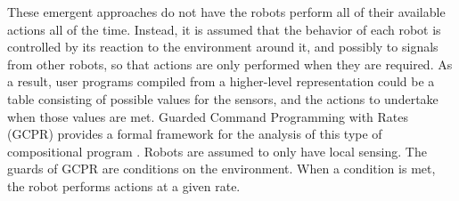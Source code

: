 \documentclass[]{article}
\begin{document}
These emergent approaches do not have the robots perform all of their available actions all of the time. 
Instead, it is assumed that the behavior of each robot is controlled by its reaction to the environment around it, and possibly to signals from other robots, so that actions are only performed when they are required. 
As a result, user programs compiled from a higher-level representation could be a table consisting of possible values for the sensors, and the actions to undertake when those values are met.
Guarded Command Programming with Rates (GCPR) provides a formal framework for the analysis of this type of compositional program \cite{napp2011compositional}. 
Robots are assumed to only have local sensing.
The guards of GCPR are conditions on the environment.
When a condition is met, the robot performs actions at a given rate. 
\end{document}
